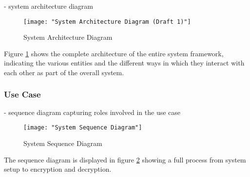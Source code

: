 - system architecture diagram

\begin{figure}[h]
	\centering
	\texttt{[image: "System Architecture Diagram (Draft 1)"]}
	\caption{System Architecture Diagram}
	\label{fig:sysarch}
\end{figure}

Figure \ref{fig:sysarch} shows the complete architecture of the entire system framework, indicating the various entities and the different ways in which they interact with each other as part of the overall system.


\subsubsection{Use Case}

- sequence diagram capturing roles involved in the use case


\begin{figure}[h]
	\centering
	\texttt{[image: "System Sequence Diagram"]}
	\caption{System Sequence Diagram}
	\label{fig:sysseq}
\end{figure}

The sequence diagram is displayed in figure \ref{fig:sysseq} showing a full process from system setup to encryption and decryption.